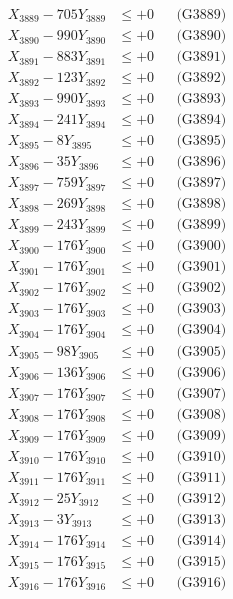 \documentclass[a4paper,10pt]{article}
\begin{document}
{\begin{align}
X_{3889} - 705Y_{3889} &\leq +0 && \text{(G3889)} \\
X_{3890} - 990Y_{3890} &\leq +0 && \text{(G3890)} \\
\allowbreak
X_{3891} - 883Y_{3891} &\leq +0 && \text{(G3891)} \\
X_{3892} - 123Y_{3892} &\leq +0 && \text{(G3892)} \\
X_{3893} - 990Y_{3893} &\leq +0 && \text{(G3893)} \\
X_{3894} - 241Y_{3894} &\leq +0 && \text{(G3894)} \\
X_{3895} - 8Y_{3895} &\leq +0 && \text{(G3895)} \\
X_{3896} - 35Y_{3896} &\leq +0 && \text{(G3896)} \\
X_{3897} - 759Y_{3897} &\leq +0 && \text{(G3897)} \\
X_{3898} - 269Y_{3898} &\leq +0 && \text{(G3898)} \\
X_{3899} - 243Y_{3899} &\leq +0 && \text{(G3899)} \\
X_{3900} - 176Y_{3900} &\leq +0 && \text{(G3900)} \\
\allowbreak
X_{3901} - 176Y_{3901} &\leq +0 && \text{(G3901)} \\
X_{3902} - 176Y_{3902} &\leq +0 && \text{(G3902)} \\
X_{3903} - 176Y_{3903} &\leq +0 && \text{(G3903)} \\
X_{3904} - 176Y_{3904} &\leq +0 && \text{(G3904)} \\
X_{3905} - 98Y_{3905} &\leq +0 && \text{(G3905)} \\
X_{3906} - 136Y_{3906} &\leq +0 && \text{(G3906)} \\
X_{3907} - 176Y_{3907} &\leq +0 && \text{(G3907)} \\
X_{3908} - 176Y_{3908} &\leq +0 && \text{(G3908)} \\
X_{3909} - 176Y_{3909} &\leq +0 && \text{(G3909)} \\
X_{3910} - 176Y_{3910} &\leq +0 && \text{(G3910)} \\
\allowbreak
X_{3911} - 176Y_{3911} &\leq +0 && \text{(G3911)} \\
X_{3912} - 25Y_{3912} &\leq +0 && \text{(G3912)} \\
X_{3913} - 3Y_{3913} &\leq +0 && \text{(G3913)} \\
X_{3914} - 176Y_{3914} &\leq +0 && \text{(G3914)} \\
X_{3915} - 176Y_{3915} &\leq +0 && \text{(G3915)} \\
X_{3916} - 176Y_{3916} &\leq +0 && \text{(G3916)} \\

\end{align}}
\end{document}
